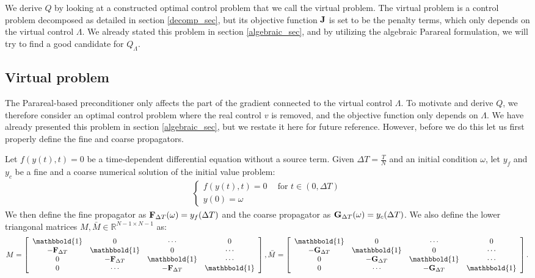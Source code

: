 \\
\\
We derive $Q$ by looking at a constructed optimal control problem that we call the virtual problem. The virtual problem is a control problem decomposed as detailed in section \ref{decomp_sec}, but its objective function $\bold J$ is set to be the penalty terms, which only depends on the virtual control $\Lambda$. We already stated this problem in section \ref{algebraic_sec}, and by utilizing the algebraic Parareal formulation, we will try to find a good candidate for $Q_{\Lambda}$.
\subsection{Virtual problem} \label{vir_sec}
The Parareal-based preconditioner only affects the part of the gradient connected to the virtual control $\Lambda$. To motivate and derive $Q$, we therefore consider an optimal control problem where the real control $v$ is removed, and the objective function only depends on $\Lambda$. We have already presented this problem in section \ref{algebraic_sec}, but we restate it here for future reference. However, before we do this let us first properly define the fine and coarse propagators.
\begin{definition} \label{prop_def}
Let $f(y(t),t)=0$ be a time-dependent differential equation without a source term. Given $\Delta T=\frac{T}{N}$ and an initial condition $\omega$, let $y_f$ and $y_c$ be a fine and a coarse numerical solution of the initial value problem:
\begin{align}
 \left\{
     \begin{array}{lr}
		f(y(t),t)=0 \ \quad \textrm{for $t \in (0,\Delta T)$} \\
		y(0)=\omega
	\end{array}
	\right.	
\end{align}
We then define the fine propagator as $\bold F_{\Delta T}(\omega) = y_f(\Delta T)$ and the coarse propagator as $\bold G_{\Delta T}(\omega) = y_c(\Delta T)$. We also define the lower triangonal matrices $M,\bar M\in\mathbb{R}^{N-1\times N-1}$ as: 
\begin{align*}
M= \left[ \begin{array}{cccc}
   \mathbbold{1} & 0 & \cdots & 0 \\  
   -\bold{F}_{\Delta T} & \mathbbold{1} & 0 & \cdots \\ 
   0 &-\bold{F}_{\Delta T} & \mathbbold{1}  & \cdots \\
   0 &\cdots &-\bold{F}_{\Delta T} & \mathbbold{1}  \\
   \end{array}  \right],
\bar M= \left[ \begin{array}{cccc}
   \mathbbold{1} & 0 & \cdots & 0 \\  
   -\bold{G}_{\Delta T} & \mathbbold{1} & 0 & \cdots \\ 
   0 &-\bold{G}_{\Delta T} & \mathbbold{1}  & \cdots \\
   0 &\cdots &-\bold{G}_{\Delta T} & \mathbbold{1}   \\
   \end{array}  \right].
\end{align*}
\end{definition}
